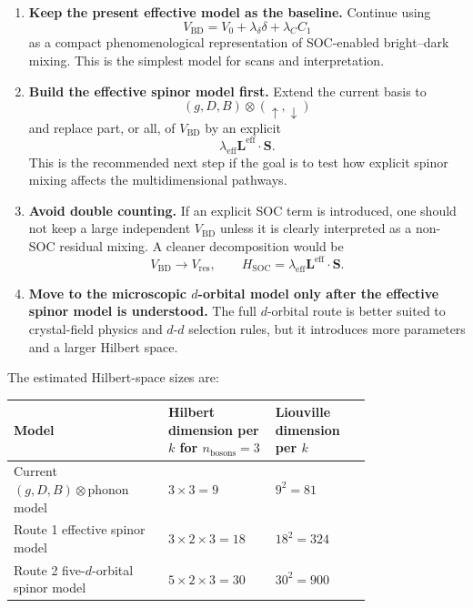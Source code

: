 \documentclass[11pt]{article}
\begin{document}
\begin{enumerate}
    \item \textbf{Keep the present effective model as the baseline.}
    Continue using
    \begin{equation}
    V_{\mathrm{BD}}
    =
    V_0+\lambda_\delta\delta+\lambda_C C_1
    \end{equation}
    as a compact phenomenological representation of SOC-enabled bright--dark mixing. This is the simplest model for scans and interpretation.

    \item \textbf{Build the effective spinor model first.}
    Extend the current basis to
    \begin{equation}
    (g,D,B)\otimes(\uparrow,\downarrow)
    \end{equation}
    and replace part, or all, of \(V_{\mathrm{BD}}\) by an explicit
    \begin{equation}
    \lambda_{\mathrm{eff}}\bm{L}^{\mathrm{eff}}\cdot\bm{S}.
    \end{equation}
    This is the recommended next step if the goal is to test how explicit spinor mixing affects the multidimensional pathways.

    \item \textbf{Avoid double counting.}
    If an explicit SOC term is introduced, one should not keep a large independent \(V_{\mathrm{BD}}\) unless it is clearly interpreted as a non-SOC residual mixing. A cleaner decomposition would be
    \begin{equation}
    V_{\mathrm{BD}}\rightarrow V_{\mathrm{res}},
    \qquad
    H_{\mathrm{SOC}}
    =
    \lambda_{\mathrm{eff}}\bm{L}^{\mathrm{eff}}\cdot\bm{S}.
    \end{equation}

    \item \textbf{Move to the microscopic \(d\)-orbital model only after the effective spinor model is understood.}
    The full \(d\)-orbital route is better suited to crystal-field physics and \(d\)-\(d\) selection rules, but it introduces more parameters and a larger Hilbert space.
\end{enumerate}

The estimated Hilbert-space sizes are:
\begin{center}
\begin{tabular}{>{\centering\arraybackslash}p{0.34\linewidth} >{\centering\arraybackslash}p{0.22\linewidth} >{\centering\arraybackslash}p{0.22\linewidth}}
\toprule
Model & Hilbert dimension per \(k\) for \(n_{\mathrm{bosons}}=3\) & Liouville dimension per \(k\) \\
\midrule
Current \((g,D,B)\otimes\mathrm{phonon}\) model & \(3\times3=9\) & \(9^2=81\) \\
Route 1 effective spinor model & \(3\times2\times3=18\) & \(18^2=324\) \\
Route 2 five-\(d\)-orbital spinor model & \(5\times2\times3=30\) & \(30^2=900\) \\
\bottomrule
\end{tabular}
\end{center}
\end{document}
